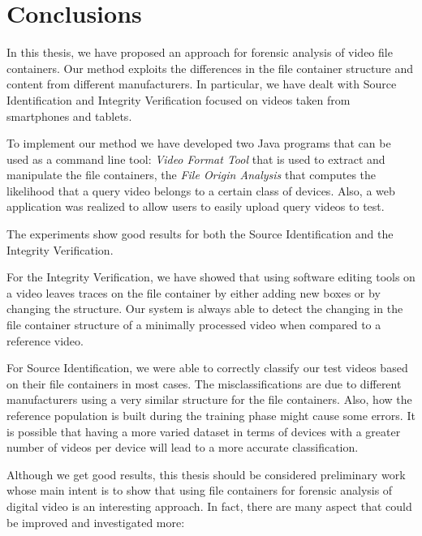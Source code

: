 \chapter*{Conclusions}

In this thesis, we have proposed an approach for forensic analysis of video file containers. Our method exploits the differences in the file container structure and content from different manufacturers. In particular, we have dealt with Source Identification and Integrity Verification focused on videos taken from smartphones and tablets.

To implement our method we have developed two Java programs that can be used as a command line tool: \emph{Video Format Tool} that is used to extract and manipulate the file containers, the \emph{File Origin Analysis} that computes the likelihood that a query video belongs to a certain class of devices. Also, a web application was realized to allow users to easily upload query videos to test.

The experiments show good results for both the Source Identification and the Integrity Verification.

For the Integrity Verification, we have showed that using software editing tools on a video leaves traces on the file container by either adding new boxes or by changing the structure. Our system is always able to detect the changing in the file container structure of a minimally processed video when compared to a reference video. 

For Source Identification, we were able to correctly classify our test videos based on their file containers in most cases. The misclassifications are due to different manufacturers using a very similar structure for the file containers. Also, how the reference population is built during the training phase might cause some errors. It is possible that having a more varied dataset in terms of devices with a greater number of videos per device will lead to a more accurate classification.

Although we get good results, this thesis should be considered preliminary work whose main intent is to show that using file containers for forensic analysis of digital video is an interesting approach. In fact, there are many aspect that could be improved and investigated more:

